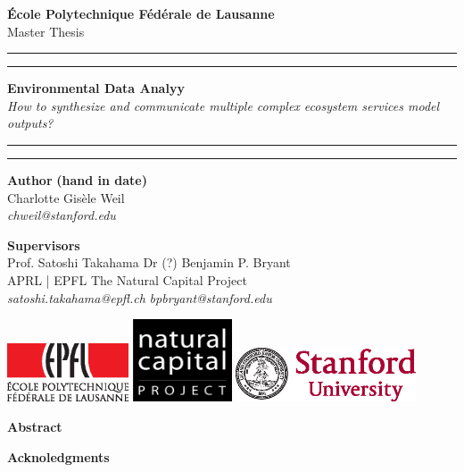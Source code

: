 
\begin{titlingpage}
\begin{center}
\Large
\textbf{École Polytechnique Fédérale de Lausanne} \\
\vspace{1cm}
Master Thesis
\vspace{2cm}
\hrule
\vspace{0.1cm}
\hrule
\vspace{1cm}
\Huge
\textbf{Environmental Data Analyy} \\

\Large
\vspace{0.2cm}
\textit{How to synthesize and communicate multiple complex ecosystem services model outputs?} \\

\vspace{1cm}
\hrule
\vspace{0.1cm}
\hrule

\end{center}
\vfill
\noindent \textbf{Author} \hfill \textbf{(hand in date)} \\
Charlotte Gisèle Weil \\
\textit{chweil@stanford.edu} \\
\vspace{0.5cm}

\noindent \textbf{Supervisors} \\
Prof. Satoshi Takahama          \hfill    Dr (?) Benjamin P. Bryant \\
APRL | EPFL      \hfill    The Natural Capital Project\\
\textit{satoshi.takahama@epfl.ch} \hfill    \textit{bpbryant@stanford.edu} \\
\vspace{0.8cm}

\noindent

\includegraphics[width=0.27\textwidth]{images/epfl-logo.eps}
\hfill
\includegraphics[width=0.22\textwidth]{images/natcap-logo.eps}
\hfill
\includegraphics[width=0.4\textwidth]{images/stanford-logo.eps}

\end{titlingpage}

\newpage 
\textbf{Abstract}

\newpage
\textbf{Acknoledgments}
\newpage
